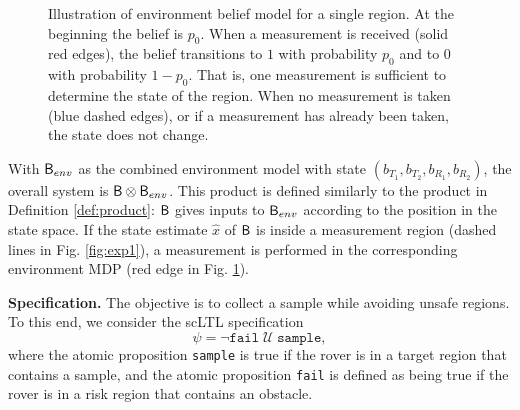 \documentclass{ifacconf}
\begin{document}
\begin{figure}
  \begin{center}
  \end{center}
  \caption{Illustration of environment belief model for a single region. At the beginning the belief is $p_0$. When a measurement is received (solid red edges), the belief transitions to $1$ with probability $p_0$ and to $0$ with probability $1-p_0$. That is, one measurement is sufficient to determine the state of the region. When no measurement is taken (blue dashed edges), or if a measurement has already been taken, the state does not change.}
  \label{fig:envmdp}
\end{figure}

With $\mathsf{B}_{env}$ as the combined environment model with state $(b_{T_1}, b_{T_2}, b_{R_1}, b_{R_2})$, the overall system is $\mathsf{B} \otimes \mathsf{B}_{env}$. This product is defined similarly to the product in Definition \ref{def:product}: $\mathsf{B}$ gives inputs to $\mathsf{B}_{env}$ according to the position in the state space. If the state estimate $\hat x$ of $\mathsf{B}$ is inside a measurement region (dashed lines in Fig. \ref{fig:exp1}), a measurement is performed in the corresponding environment MDP (red edge in Fig. \ref{fig:envmdp}).


\textbf{Specification.} The objective is to collect a sample while avoiding unsafe regions. To this end, we consider the scLTL specification
\begin{equation}
  \psi =\lnot \texttt{fail} \; \mathcal {U} \; \texttt{sample},
\end{equation}
where the atomic proposition \texttt{sample} is true if the rover is in a target region that contains a sample, and the atomic proposition \texttt{fail} is defined as being true if the rover is in a risk region that contains an obstacle.
\end{document}
